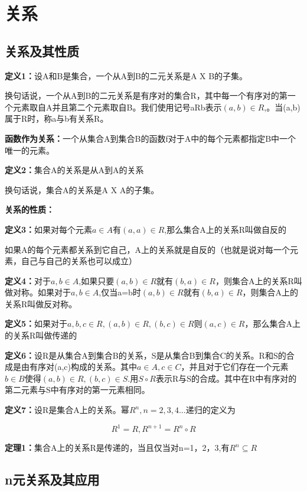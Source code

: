 \documentclass{ctexart}
\begin{document}
	\section{关系}
	
	\subsection{关系及其性质}
	
	\textbf{定义1：}设A和B是集合，一个从A到B的二元关系是A X B的子集。
	
	换句话说，一个从A到B的二元关系是有序对的集合R，其中每一个有序对的第一个元素取自A并且第二个元素取自B。我们使用记号aRb表示\((a,b)\in R\),。当(a,b)属于R时，称a与b有关系R。
	
	\textbf{函数作为关系：}一个从集合A到集合B的函数f对于A中的每个元素都指定B中一个唯一的元素。
	
	\textbf{定义2：}集合A的关系是从A到A的关系
	
	换句话说，集合A的关系是A X A的子集。
	
	\textbf{关系的性质：}
	
	\textbf{定义3：}如果对每个元素\(a \in A\)有\((a, a) \in R\),那么集合A上的关系R叫做自反的
	
	如果A的每个元素都关系到它自己，A上的关系就是自反的（也就是说对每一个元素，自己与自己的关系也可以成立）
	
	\textbf{定义4：}对于\(a, b \in A\),如果只要\((a, b) \in R\)就有\((b,a) \in R\)，则集合A上的关系R叫做对称。如果对于\(a, b \in A\),仅当a=b时\((a, b) \in R\)就有\((b,a) \in R\)，则集合A上的关系R叫做反对称。
	
	\textbf{定义5：}如果对于\(a, b, c \in R, (a, b) \in R, (b,c) \in R\)则\((a, c)\in R\)，那么集合A上的关系R叫做传递的
	
	\textbf{定义6：}设R是从集合A到集合B的关系，S是从集合B到集合C的关系。R和S的合成是由有序对(a,c)构成的关系。其中\(a \in A, c \in C\)，并且对于它们存在一个元素\(b \in B\)使得\((a, b)\in R, (b,c)\in S\).用\(S \circ R\)表示R与S的合成。其中在R中有序对的第二元素与S中有序对的第一元素相同。
	
	\textbf{定义7：}设R是集合A上的关系。幂\(R^n, n=2,3,4...\)递归的定义为
	
	\[R^1 = R, R^{n+1} = R^n \circ R\]
	
	\textbf{定理1：}集合A上的关系R是传递的，当且仅当对n=1，2，3,有\(R^n \subseteq R\)
	
	\subsection{n元关系及其应用}
	
\end{document}
